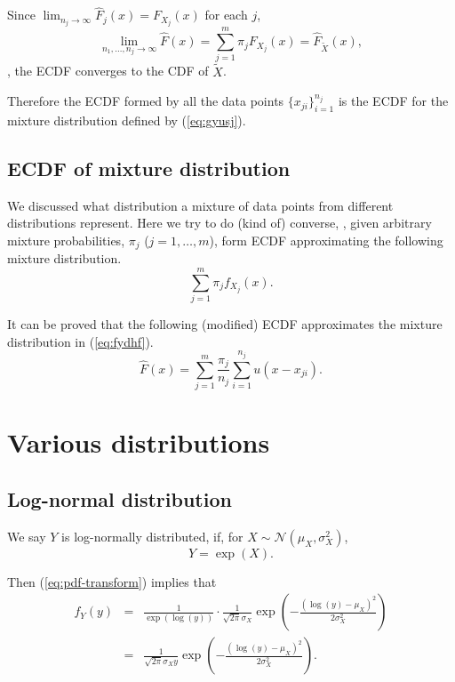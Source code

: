 Since $\lim_{n_j\to\infty} \hat{F}_j(x) = F_{X_j}(x)$ for each $j$,
\begin{equation}
\lim_{n_1, \ldots, n_j \to\infty} \hat{F}(x) = \sum_{j=1}^m \pi_j F_{X_j}(x) = \hat{F}_{\tilde{X}}(x),
\end{equation}
\ie,
the ECDF converges to the CDF of $\tilde{X}$.

Therefore the ECDF formed by all the data points $\{x_{ji}\}_{i=1}^{n_j}$
is the ECDF for the mixture distribution defined by (\ref{eq:gyusj}).


\subsection{ECDF of mixture distribution}

We discussed what distribution a mixture of data points from different distributions represent.
Here we try to do (kind of) converse,
\ie,
given arbitrary mixture probabilities, $\pi_j$ ($j=1,\ldots,m$),
form ECDF approximating the following mixture distribution.
\begin{equation}
\label{eq:fydhf}
\sum_{j=1}^m \pi_j f_{X_j}(x).
\end{equation}

It can be proved that the following (modified) ECDF approximates the mixture distribution in (\ref{eq:fydhf}).
\begin{equation}
\hat{F}(x) = \sum_{j=1}^m \frac{\pi_j}{n_j} \sum_{i=1}^{n_j} u(x- x_{ji}).
\end{equation}


\section{Various distributions}

\subsection{Log-normal distribution}

 We say $Y$ is log-normally distributed, if, for $X\sim\mathcal{N}(\mu_X,\sigma_X^2)$,
 \begin{equation}
 Y = \exp(X).
 \end{equation}

Then (\ref{eq:pdf-transform}) implies that
\begin{eqnarray}
f_Y(y) &=& \frac{1}{\exp(\log(y))} \cdot \frac{1}{\sqrt{2\pi} \sigma_X}  \exp\left(-\frac{(\log(y)-\mu_X)^2}{2\sigma_X^2}\right)
\nonumber
\\
&=& \frac{1}{\sqrt{2\pi} \sigma_X y}  \exp\left(-\frac{(\log(y)-\mu_X)^2}{2\sigma_X^2}\right).
\label{eq:log-normal-pdf}
\end{eqnarray}


